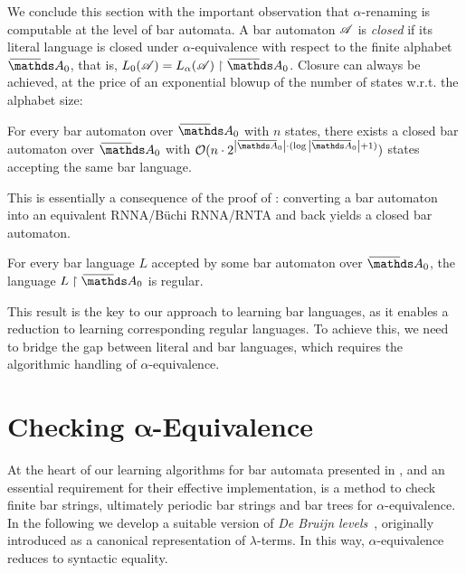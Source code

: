 \documentclass[a4paper,UKenglish,cleveref,autoref,thm-restate,numberwithinsect,final]{lipics-v2021}
\begin{document}
We conclude this section with the important observation that $\alpha$-renaming is computable at the level of bar automata.
    A bar automaton $\mathscr{A}$ is \emph{closed} if its literal language is closed under $\alpha$-equivalence with respect to the
    finite alphabet $\barNames_0$, that is, 
$L_0(\A) = L_\alpha(\A) \restriction \barNames_0$. 
Closure can always be achieved, at the price of an exponential blowup of the number of states w.r.t. the alphabet size:

    \begin{prop}\label{prop:barautclosure}
      For every bar automaton over $\barNames_0$ with $n$ states, there
      exists a closed bar automaton over $\barNames_0$ with $\mathcal{O}(n\cdot 2^{\card{\barNamess_0}\cdot (\log{\card{\barNamess_0}} + 1)})$ states accepting the same bar language.
    \end{prop}
This is essentially a consequence of the proof of : converting a bar automaton into an equivalent RNNA/Büchi RNNA/RNTA and back yields a closed bar automaton.

\begin{corollary}\label{cor:restr-regular}
For every bar language $L$ accepted by some bar automaton over $\barNames_0$, the language $L\restriction \barNames_0$ is regular.
\end{corollary}
This result is the key to our approach to learning bar languages, as it enables a reduction to learning corresponding regular languages. To achieve this, we need to bridge the gap between literal and bar languages, which requires the algorithmic handling of $\alpha$-equivalence.



    \section{Checking \texorpdfstring{$\boldsymbol{\alpha}$}{$\alpha$}-Equivalence}\label{sec:checkingAlphaEquiv}

At the heart of our learning algorithms for bar automata presented in , and an essential requirement for their effective implementation, is a method to check finite bar strings, ultimately periodic bar strings and bar trees for $\alpha$-equivalence. In the following we develop a suitable version of \emph{De Bruijn levels}~\cite{db72}, originally introduced as a canonical representation of $\lambda$-terms. In this way, $\alpha$-equivalence reduces to syntactic equality.
    
\end{document}
